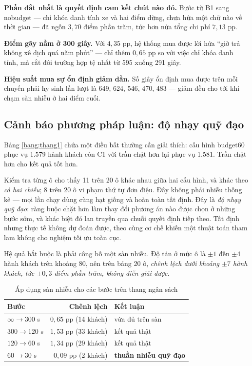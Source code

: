 \textbf{Phần đắt nhất là quyết định cam kết chút nào đó.} Bước từ B1 sang nobudget --- chỉ khóa
danh tính xe và hai điểm dừng, chưa hứa một chữ nào về thời gian --- đã ngốn $3{,}70$ điểm phần
trăm, tức hơn nửa tổng chi phí $7{,}13$ pp.

\textbf{Điểm gãy nằm ở 300 giây.} Với $4{,}35$ pp, hệ thống mua được lời hứa ``giờ trả không xê
dịch quá năm phút'' --- chỉ thêm $0{,}65$ pp so với việc chỉ khóa danh tính, mà cắt đôi trường
hợp tệ nhất từ 595 xuống 291 giây.

\textbf{Hiệu suất mua sự ổn định giảm dần.} Số giây ổn định mua được trên mỗi chuyến phải hy
sinh lần lượt là 649, 624, 546, 470, 483 --- giảm đều cho tới khi chạm sàn nhiễu ở hai điểm cuối.

\subsection{Cảnh báo phương pháp luận: độ nhạy quỹ đạo}

Bảng \ref{bang:thang1} chứa một điều bất thường cần giải thích: cấu hình budget60 phục vụ 1.579
hành khách còn C1 với trần chặt hơn lại phục vụ 1.581. Trần chặt hơn cho kết quả tốt hơn.

Kiểm tra từng ô cho thấy 11 trên 20 ô khác nhau giữa hai cấu hình, và khác theo \emph{cả hai
chiều}; 8 trên 20 ô vi phạm thứ tự đơn điệu. Đây không phải nhiễu thống kê --- mọi lần chạy dùng
cùng hạt giống và hoàn toàn tất định. Đây là \emph{độ nhạy quỹ đạo}: ràng buộc chặt hơn làm thay
đổi phương án nào được chọn ở những bước sớm, và khác biệt đó lan truyền qua chuỗi quyết định
tiếp theo. Tất định nhưng thực tế không dự đoán được, theo cùng cơ chế khiến một thuật toán tham
lam không cho nghiệm tối ưu toàn cục.

Hệ quả bắt buộc là phải công bố một sàn nhiễu. Độ tán ở mức ô là $\pm 1$ đến $\pm 4$ hành khách
trên khoảng 80, nên trên bảng 20 ô, \emph{chênh lệch dưới khoảng $\pm 7$ hành khách, tức
$\pm 0{,}3$ điểm phần trăm, không diễn giải được}.

\begin{table}[htbp]
\centering
\caption{Áp dụng sàn nhiễu cho các bước trên thang ngân sách}
\label{bang:sannhieu}
\small
\begin{tabular}{@{}lrl@{}}
\toprule
\textbf{Bước} & \textbf{Chênh lệch} & \textbf{Kết luận}\\
\midrule
$\infty \to 300$ s & $0{,}65$ pp (14 khách) & vừa đủ trên sàn\\
$300 \to 120$ s & $1{,}53$ pp (33 khách) & kết quả thật\\
$120 \to 60$ s & $1{,}34$ pp (29 khách) & kết quả thật\\
$60 \to 30$ s & $0{,}09$ pp (2 khách) & \textbf{thuần nhiễu quỹ đạo}\\
\bottomrule
\end{tabular}
\end{table}

